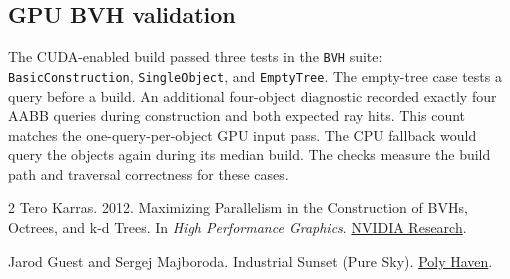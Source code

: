 \documentclass[acmtog]{acmart}
\begin{document}
\subsection{GPU BVH validation}
The CUDA-enabled build passed three tests in the \texttt{BVH} suite: \texttt{BasicConstruction}, \texttt{SingleObject}, and \texttt{EmptyTree}. The empty-tree case tests a query before a build. An additional four-object diagnostic recorded exactly four AABB queries during construction and both expected ray hits. This count matches the one-query-per-object GPU input pass. The CPU fallback would query the objects again during its median build. The checks measure the build path and traversal correctness for these cases.

\begin{thebibliography}{2}
Tero Karras. 2012.
\newblock Maximizing Parallelism in the Construction of BVHs, Octrees, and k-d Trees.
\newblock In \emph{High Performance Graphics}. \href{https://research.nvidia.com/publication/2012-06_maximizing-parallelism-construction-bvhs-octrees-and-k-d-trees}{NVIDIA Research}.

Jarod Guest and Sergej Majboroda.
\newblock Industrial Sunset (Pure Sky).
\newblock \href{https://polyhaven.com/a/industrial_sunset_puresky}{Poly Haven}.
\end{thebibliography}
\end{document}
